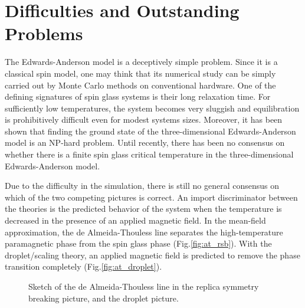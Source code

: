\section{Difficulties and Outstanding Problems}
The Edwards-Anderson model is a deceptively simple problem. Since it is a classical spin 
model, one may think that its numerical study can be simply carried out by Monte
Carlo methods on conventional hardware. One of the defining signatures of spin glass 
systems is their long relaxation time. 
For sufficiently low temperatures, the system becomes very sluggish and 
equilibration is prohibitively difficult even for modest systems sizes. 
Moreover, it has been shown that finding the ground state of the three-dimensional
Edwards-Anderson model is an NP-hard problem. \cite{Barahona-1982} 
Until recently, there has been no consensus on whether there is a finite spin 
glass critical temperature in the three-dimensional Edwards-Anderson model.


Due to the difficulty in the simulation, there is still no general consensus on
which of the two competing pictures is correct. 
An import discriminator between the theories is the predicted behavior of 
the system when the temperature is decreased in the presence of an applied magnetic
field. 
In the mean-field approximation, the de Almeida-Thouless line separates the 
high-temperature paramagnetic phase from the spin glass phase (Fig.\ref{fig:at_rsb}). 
With the droplet/scaling theory, an applied magnetic field is predicted to remove
the phase transition completely (Fig.\ref{fig:at_droplet}).

\begin{figure}
  \centering
  \hspace{0.5cm}
  \caption{Sketch of the de Almeida-Thouless line in the replica symmetry breaking 
picture, and the droplet picture.}
  \label{fig:at_line}
\end{figure}

